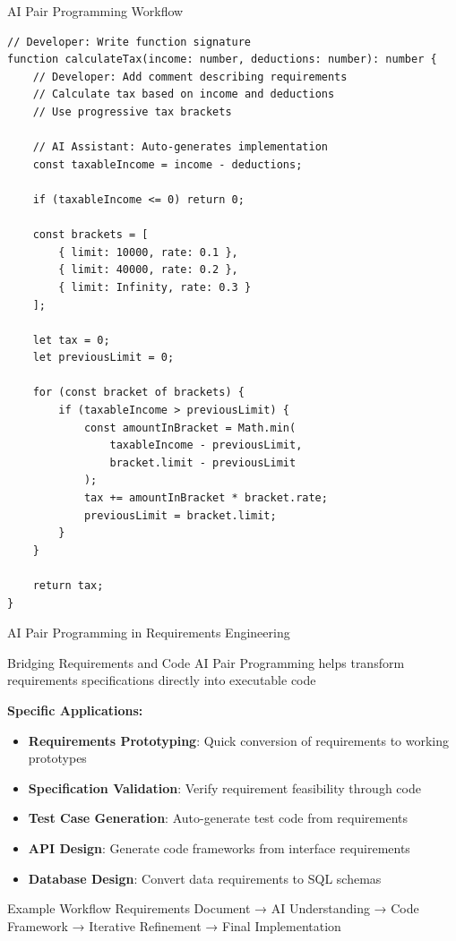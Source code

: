 \documentclass{beamer}
\begin{document}
\begin{frame}[t,fragile]{AI Pair Programming Workflow}
    \begin{lstlisting}[style=code, caption={Typical AI Pair Programming Interaction}]
// Developer: Write function signature
function calculateTax(income: number, deductions: number): number {
    // Developer: Add comment describing requirements
    // Calculate tax based on income and deductions
    // Use progressive tax brackets
    
    // AI Assistant: Auto-generates implementation
    const taxableIncome = income - deductions;
    
    if (taxableIncome <= 0) return 0;
    
    const brackets = [
        { limit: 10000, rate: 0.1 },
        { limit: 40000, rate: 0.2 },
        { limit: Infinity, rate: 0.3 }
    ];
    
    let tax = 0;
    let previousLimit = 0;
    
    for (const bracket of brackets) {
        if (taxableIncome > previousLimit) {
            const amountInBracket = Math.min(
                taxableIncome - previousLimit, 
                bracket.limit - previousLimit
            );
            tax += amountInBracket * bracket.rate;
            previousLimit = bracket.limit;
        }
    }
    
    return tax;
}
    \end{lstlisting}
\end{frame}

\begin{frame}[t]{AI Pair Programming in Requirements Engineering}
    \begin{block}{Bridging Requirements and Code}
        AI Pair Programming helps transform requirements specifications directly into executable code
    \end{block}
    
    \textbf{Specific Applications:}
    \begin{itemize}
        \item \textbf{Requirements Prototyping}: Quick conversion of requirements to working prototypes
        \item \textbf{Specification Validation}: Verify requirement feasibility through code
        \item \textbf{Test Case Generation}: Auto-generate test code from requirements
        \item \textbf{API Design}: Generate code frameworks from interface requirements
        \item \textbf{Database Design}: Convert data requirements to SQL schemas
    \end{itemize}
    
    \begin{exampleblock}{Example Workflow}
        Requirements Document → AI Understanding → Code Framework → Iterative Refinement → Final Implementation
    \end{exampleblock}
\end{frame}
\end{document}
